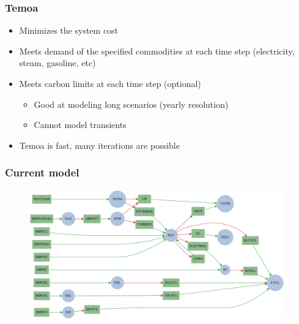 
\begin{frame}
\frametitle{Temoa}
	\begin{itemize}
		\item Minimizes the system cost
		\item Meets demand of the specified commodities at each time step (electricity, steam, gasoline, etc)
		\item Meets carbon limits at each time step (optional)
		\begin{itemize}
			\item Good at modeling long scenarios (yearly resolution)
			\item Cannot model transients
		\end{itemize}
		\item Temoa is fast, many iterations are possible
	\end{itemize}
\end{frame}


\begin{frame}
\frametitle{Current model}

	\begin{figure}[htbp!]
		\begin{center}
			\includegraphics[height=5.6cm]{images/scenario11.png}
		\end{center}
	\end{figure}

\end{frame}


